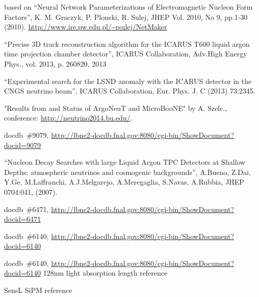 \begin{thebibliography}{99}
 based on
``Neural Network Parameterizations of Electromagnetic Nucleon Form Factors'', K. M. Graczyk, P. Plonski, R. Sulej, JHEP Vol. 2010, No 9, pp.1-30 (2010).
\url{http://www.ire.pw.edu.pl/~rsulej/NetMaker}

``Precise 3D track reconstruction algorithm for the ICARUS T600 liquid argon time projection chamber detector'', ICARUS Collaboration, 
Adv.High Energy Phys., vol. 2013, p. 260820, 2013

 ``Experimental search for the LSND anomaly with the ICARUS
detector in the CNGS neutrino beam'', ICARUS Collaboration, Eur. Phys. J. C (2013) 73:2345.

 "Results from and Status of ArgoNeuT and MicroBooNE" by 
A. Szelc., conference: \url{http://neutrino2014.bu.edu/}.

 docdb~\#9079, \url{http://lbne2-docdb.fnal.gov:8080/cgi-bin/ShowDocument?docid=9079}

``Nucleon Decay Searches with large Liquid Argon TPC Detectors at Shallow Depths: atmospheric neutrinos and cosmogenic backgrounds'', A.Bueno, Z.Dai, Y.Ge, M.Laffranchi, A.J.Melgarejo, A.Meregaglia, S.Navas, A.Rubbia, JHEP 0704:041, (2007).

%
%
 docdb~\#6471, \url{http://lbne2-docdb.fnal.gov:8080/cgi-bin/ShowDocument?docid=6471}

 docdb~\#6140, \url{http://lbne2-docdb.fnal.gov:8080/cgi-bin/ShowDocument?docid=6140}

 docdb~\#6140, \url{http://lbne2-docdb.fnal.gov:8080/cgi-bin/ShowDocument?docid=6140}
 128nm light absorption length reference


 SensL SiPM reference



%
%



\end{thebibliography}
